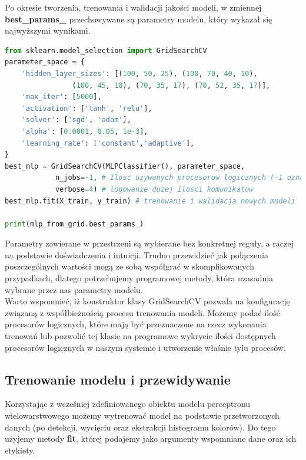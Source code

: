 Po okresie tworzenia, trenowania i walidacji jakości modeli, w zmiennej \textbf{best\_params\_} przechowywane są parametry modelu, który wykazał się najwyższymi wynikami.

\begin{lstlisting}[language=Python, caption=Przykład użycia klasy GridSearchCV]
from sklearn.model_selection import GridSearchCV
parameter_space = {
    'hidden_layer_sizes': [(100, 50, 25), (100, 70, 40, 10),
                (100, 45, 10), (70, 35, 17), (70, 52, 35, 17)],
    'max_iter': [5000],
    'activation': ['tanh', 'relu'],
    'solver': ['sgd', 'adam'],
    'alpha': [0.0001, 0.05, 1e-3],
    'learning_rate': ['constant','adaptive'],
}
best_mlp = GridSearchCV(MLPClassifier(), parameter_space,  
            n_jobs=-1, # Ilosc uzywanych procesorow logicznych (-1 oznacza uzycie wszystkich dostepnych w systemie)
            verbose=4) # logowanie duzej ilosci komunikatow
best_mlp.fit(X_train, y_train) # trenowanie i walidacja nowych modeli

print(mlp_from_grid.best_params_)
\end{lstlisting}

Parametry zawierane w przestrzeni są wybierane bez konkretnej reguły, a raczej na podstawie doświadczenia i intuicji. Trudno przewidzieć jak połączenia poszczególnych wartości mogą ze sobą współgrać w skomplikowanych przypadkach, dlatego potrzebujemy programowej metody, która uzasadnia wybrane przez nas parametry modelu.\\

Warto wspomnieć, iż konstruktor klasy GridSearchCV pozwala na konfigurację związaną z współbieżnością procesu trenowania modeli. Możemy podać ilość procesorów logicznych, które mają być przeznaczone na rzecz wykonania trenowań lub pozwolić tej klasie na programowe wykrycie ilości dostępnych procesorów logicznych w naszym systemie i utworzenie właśnie tylu procesów.
    
\pagebreak
    
\subsection{Trenowanie modelu i przewidywanie}
Korzystając z wcześniej zdefiniowanego obiektu modelu perceptronu wielowarstwowego możemy wytrenować model na podstawie przetworzonych danych (po detekcji, wycięciu oraz ekstrakcji histogramu kolorów). Do tego użyjemy metody \textbf{fit}, której podajemy jako argumenty wspomniane dane oraz ich etykiety.


